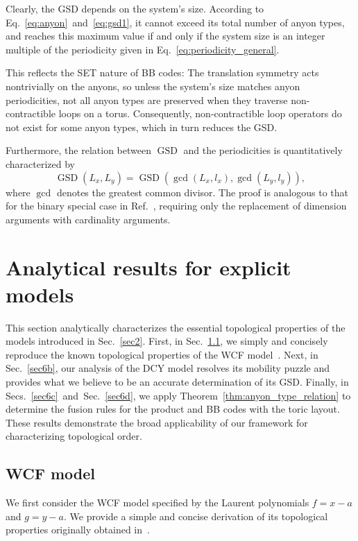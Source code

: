 \documentclass[aps,prb,english,superscriptaddress,twocolumn,tightenlines,showpacs,longbibliography,floatfix,amsfonts]{revtex4-2}
\newcommand{\gsd}{\operatorname{GSD}}
\begin{document}
Clearly, the GSD depends on the system's size. According to Eq.~\eqref{eq:anyon}~and~\eqref{eq:gsd1}, it cannot exceed its total number of anyon types, and reaches this maximum value if and only if the system size is an integer multiple of the periodicity given in Eq.~\eqref{eq:periodicity_general}.

This reflects the SET nature of BB codes: The translation symmetry acts nontrivially on the anyons, so unless the system's size matches anyon periodicities, not all anyon types are preserved when they traverse non-contractible loops on a torus. Consequently, non-contractible loop operators do not exist for some anyon types, which in turn reduces the GSD.

Furthermore, the relation between $\gsd$ and the periodicities is quantitatively characterized by 
\begin{equation}
    \gsd(L_x,L_y)=\gsd\left(\gcd(L_x,l_x), \gcd(L_y,l_y)\right),
\end{equation}
where $\gcd$ denotes the greatest common divisor. The proof is analogous to that for the binary special case in Ref.~\cite{Chen2025}, requiring only the replacement of dimension arguments with cardinality arguments.
\section{Analytical results for explicit models\label{sec6}}
This section analytically characterizes the essential topological properties of the models introduced in Sec.~\ref{sec2}. First, in Sec.~\ref{sec6a}, we simply and concisely reproduce the known topological properties of the WCF model~\cite{Watanabe2023}. Next, in Sec.~\ref{sec6b}, our analysis of the DCY model resolves its mobility puzzle and provides what we believe to be an accurate determination of its GSD. Finally, in Secs.~\ref {sec6c}~and~Sec.~\ref{sec6d}, we apply Theorem~\ref{thm:anyon_type_relation} to determine the fusion rules for the product and BB codes with the toric layout. These results demonstrate the broad applicability of our framework for characterizing topological order.
\subsection{WCF model}
\label{sec6a}
We first consider the WCF model specified by the Laurent polynomials $f=x-a$ and $g=y-a$. We provide a simple and concise derivation of its topological properties originally obtained in~\cite{Watanabe2023}.
  
\end{document}
